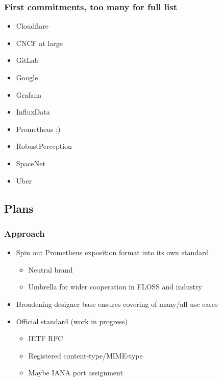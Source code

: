 \documentclass[aspectratio=169]{beamer}
\begin{document}
\begin{frame}
	\frametitle{First commitments, too many for full list}
	\vfill
	\begin{itemize}
		\item Cloudflare
		\item CNCF at large
		\item GitLab
		\item Google
		\item Grafana
		\item InfluxData
		\item Prometheus ;)
		\item RobustPerception
		\item SpaceNet
		\item Uber
	\end{itemize}
	\vfill
\end{frame}


\subsection{Plans}

\begin{frame}
	\frametitle{Approach}
	\vfill
	\begin{itemize}
		\item Spin out Prometheus exposition format into its own standard
		\begin{itemize}
			\item Neutral brand
			\item Umbrella for wider cooperation in FLOSS and industry
		\end{itemize}
		\item Broadening designer base ensures covering of many/all use cases
		\item Official standard (work in progress)
		\begin{itemize}
			\item IETF RFC
			\item Registered content-type/MIME-type
			\item Maybe IANA port assignment
		\end{itemize}
	\end{itemize}
	\vfill
\end{frame}
\end{document}
